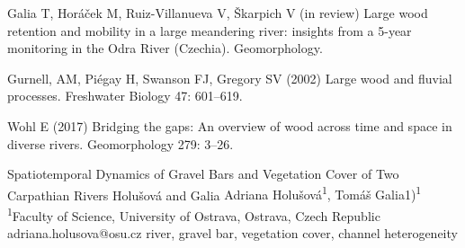 {Galia T, Horáček M, Ruiz-Villanueva V, Škarpich V (in review) Large wood retention and mobility in a large meandering river: insights from a 5-year monitoring in the Odra River (Czechia). Geomorphology.
	
	Gurnell, AM, Piégay H, Swanson FJ, Gregory SV (2002) Large wood and fluvial processes. Freshwater Biology 47: 601–619.
	
	Wohl E (2017) Bridging the gaps: An overview of wood across time and space in diverse rivers. Geomorphology 279: 3–26.
}%

\abstract
{Spatiotemporal Dynamics of Gravel Bars and Vegetation Cover of Two Carpathian Rivers} 
{Holušová and Galia} 
{Adriana Holušová\textsuperscript{1}, Tomáš Galia1)\textsuperscript{1}} 
{\KLtag} 
{
\textsuperscript{1}Faculty of Science, University of Ostrava, Ostrava, Czech Republic
}
{adriana.holusova@osu.cz}  %
{river, gravel bar, vegetation cover, channel heterogeneity}
